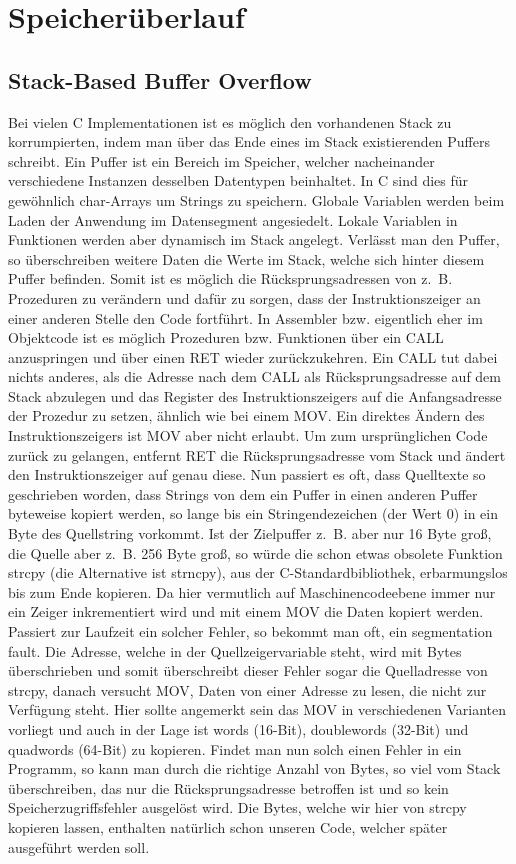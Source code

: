 \documentclass[12pt]{book}
\begin{document}
\chapter{Speicherüberlauf}

\section{Stack-Based Buffer Overflow}

Bei vielen C Implementationen ist es möglich den vorhandenen Stack zu
korrumpierten, indem man über das Ende eines im Stack existierenden Puffers
schreibt. Ein Puffer ist ein Bereich im Speicher, welcher nacheinander
verschiedene Instanzen desselben Datentypen beinhaltet. In C sind dies für
gewöhnlich char-Arrays um Strings zu speichern. Globale Variablen werden beim
Laden der Anwendung im Datensegment angesiedelt. Lokale Variablen in Funktionen
werden aber dynamisch im Stack angelegt. Verlässt man den Puffer, so
überschreiben weitere Daten die Werte im Stack, welche sich hinter diesem Puffer
befinden. Somit ist es möglich die Rücksprungsadressen von z. B. Prozeduren zu
verändern und dafür zu sorgen, dass der Instruktionszeiger an einer anderen
Stelle den Code fortführt. In Assembler bzw. eigentlich eher im Objektcode ist
es möglich Prozeduren bzw. Funktionen über ein CALL anzuspringen und über einen
RET wieder zurückzukehren. Ein CALL tut dabei nichts anderes, als die Adresse
nach dem CALL als Rücksprungsadresse auf dem Stack abzulegen und das Register
des Instruktionszeigers auf die Anfangsadresse der Prozedur zu setzen, ähnlich
wie bei einem MOV. Ein direktes Ändern des Instruktionszeigers ist MOV aber
nicht erlaubt. Um zum ursprünglichen Code zurück zu gelangen, entfernt RET die
Rücksprungsadresse vom Stack und ändert den Instruktionszeiger auf genau
diese. Nun passiert es oft, dass Quelltexte so geschrieben worden, dass Strings
von dem ein Puffer in einen anderen Puffer byteweise kopiert werden, so lange
bis ein Stringendezeichen (der Wert 0) in ein Byte des Quellstring vorkommt.
Ist der Zielpuffer z. B. aber nur 16 Byte groß, die Quelle aber z. B. 256 Byte
groß, so würde die schon etwas obsolete Funktion strcpy (die Alternative ist
strncpy), aus der C-Standardbibliothek, erbarmungslos bis zum Ende kopieren.
Da hier vermutlich auf Maschinencodeebene immer nur ein Zeiger inkrementiert
wird und mit einem MOV die Daten kopiert werden. Passiert zur Laufzeit ein
solcher Fehler, so bekommt man oft, ein segmentation fault. Die Adresse, welche
in der Quellzeigervariable steht, wird mit Bytes überschrieben und somit
überschreibt dieser Fehler sogar die Quelladresse von strcpy, danach versucht
MOV, Daten von einer Adresse zu lesen, die nicht zur Verfügung steht. Hier sollte
angemerkt sein das MOV in verschiedenen Varianten vorliegt und auch in der Lage
ist words (16-Bit), doublewords (32-Bit) und quadwords (64-Bit) zu kopieren.
Findet man nun solch einen Fehler in ein Programm, so kann man durch die
richtige Anzahl von Bytes, so viel vom Stack überschreiben, das nur die
Rücksprungsadresse betroffen ist und so kein Speicherzugriffsfehler ausgelöst
wird. Die Bytes, welche wir hier von strcpy kopieren lassen, enthalten natürlich
schon unseren Code, welcher später ausgeführt werden soll.
\end{document}
